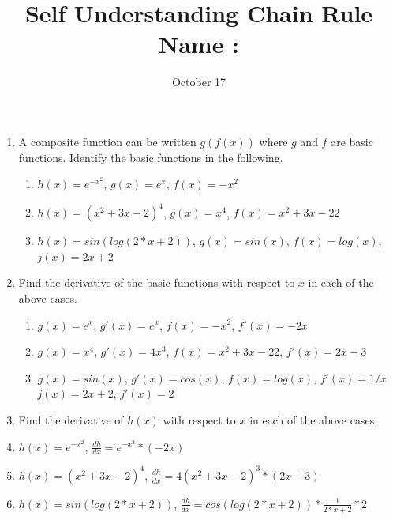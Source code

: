 \documentclass[11pt]{article}
\begin{document}
\title{Self Understanding Chain Rule \hfill Name : \underline{\hspace{3cm}}}
\date{October 17}
\maketitle
\begin{enumerate}
\item A composite function can be written $g(f(x))$ where $g$ and $f$ are basic functions.  Identify the basic functions in the following.
\begin{enumerate}
\item $h(x)=e^{-x^2}$, $g(x)=e^x$, $f(x)=-x^2$
\bigskip
\item $h(x)=(x^2+3x-2)^4$,  $g(x)=x^4$, $f(x)=x^2+3x-22$
\bigskip
\item $h(x)=sin(log(2*x+2))$, $g(x)=sin(x)$, $f(x)=log(x)$, $j(x)=2x+2$
\bigskip
\end{enumerate}
\item Find the derivative of the basic functions with respect to $x$ in each of the above cases.
\begin{enumerate}
\item $g(x)=e^{x}$, $g'(x)=e^x$, $f(x)=-x^2$, $f'(x)=-2x$
\bigskip
\item $g(x)=x^4$, $g'(x)=4x^3$, $f(x)=x^2+3x-22$, $f'(x)=2x+3$
\bigskip
\item $g(x)=sin(x)$, $g'(x)=cos(x)$, $f(x)=log(x)$, $f'(x)=1/x$   $j(x)=2x+2$,  $j'(x)=2$
\bigskip
\end{enumerate}
\item Find the derivative of $h(x)$ with respect to $x$ in each of the above cases.

\item $h(x)=e^{-x^2}$, $\frac{dh}{dx}=e^{-x^2}*(-2x)$
\bigskip
\item $h(x)=(x^2+3x-2)^4$, $\frac{dh}{dx}=4(x^2+3x-2)^3*(2x+3)$
\bigskip
\item $h(x)=sin(log(2*x+2))$, $\frac{dh}{dx}=cos(log(2*x+2))*\frac{1}{2*x+2}*2$
\bigskip
\end{enumerate}
\end{document}
